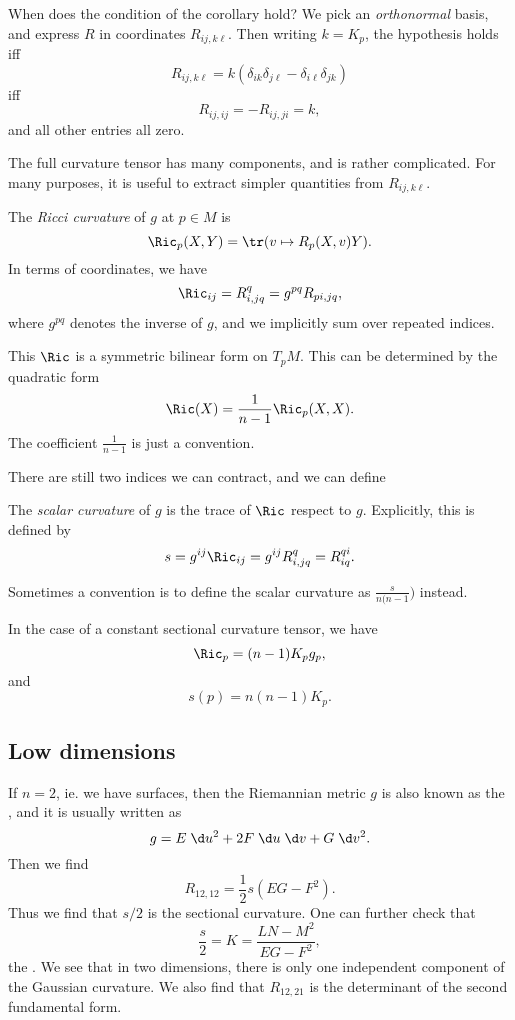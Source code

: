 \documentclass[a4paper]{article}
\begin{document}
When does the condition of the corollary hold? We pick an \emph{orthonormal} basis, and express $R$ in coordinates $R_{ij, k\ell}$. Then writing $k = K_p$, the hypothesis holds iff
\[
  R_{ij, k\ell} = k(\delta_{ik}\delta_{j\ell} - \delta_{i\ell} \delta_{jk})
\]
iff
\[
  R_{ij, ij} = - R_{ij, ji} = k,
\]
and all other entries all zero.

The full curvature tensor has many components, and is rather complicated. For many purposes, it is useful to extract simpler quantities from $R_{ij, k\ell}$.
\begin{defi}
  The \emph{Ricci curvature} of $g$ at $p \in M$ is
  \[
    \Ric_p(X, Y) = \tr(v \mapsto R_p(X, v) Y).
  \]
  In terms of coordinates, we have
  \[
    \Ric_{ij} = R^q_{i,jq} = g^{pq} R_{pi, jq},
  \]
  where $g^{pq}$ denotes the inverse of $g$, and we implicitly sum over repeated indices.

  This $\Ric$ is a symmetric bilinear form on $T_p M$. This can be determined by the quadratic form
  \[
    \Ric(X) = \frac{1}{n - 1} \Ric_p(X, X).
  \]
  The coefficient $\frac{1}{n - 1}$ is just a convention.
\end{defi}
There are still two indices we can contract, and we can define
\begin{defi}
  The \emph{scalar curvature} of $g$ is the trace of $\Ric$ respect to $g$. Explicitly, this is defined by
  \[
    s = g^{ij}\Ric_{ij} = g^{ij} R^q_{i, jq} = R^{qi}_{iq}.
  \]
\end{defi}
Sometimes a convention is to define the scalar curvature as $\frac{s}{n(n - 1})$ instead.

In the case of a constant sectional curvature tensor, we have
\[
  \Ric_p = (n - 1) K_p g_p,
\]
and
\[
  s(p) = n(n - 1) K_p.
\]

\subsection{Low dimensions}
If $n = 2$, ie. we have surfaces, then the Riemannian metric $g$ is also known as the , and it is usually written as
\[
  g = E\;\d u^2 + 2 F \;\d u\;\d v + G \;\d v^2.
\]
Then we find
\[
  R_{12,12} = \frac{1}{2} s (EG - F^2).
\]
Thus we find that $s/2$ is the sectional curvature. One can further check that
\[
  \frac{s}{2} = K = \frac{LN - M^2}{EG - F^2},
\]
the . We see that in two dimensions, there is only one independent component of the Gaussian curvature. We also find that $R_{12, 21}$ is the determinant of the second fundamental form.
\end{document}
